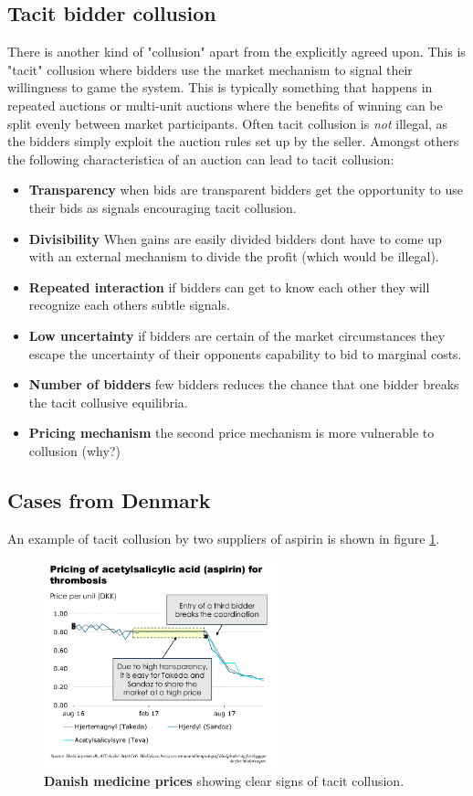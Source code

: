 
\subsection{Tacit bidder collusion}
There is another kind of "collusion" apart from the explicitly agreed upon. This is "tacit" collusion where bidders use the market mechanism to signal their willingness to game the system. This is typically something that happens in repeated auctions or multi-unit auctions where the benefits of winning can be split evenly between market participants. Often tacit collusion is \textit{not} illegal, as the bidders simply exploit the auction rules set up by the seller. Amongst others the following characteristica of an auction can lead to tacit collusion:
\begin{itemize}
    \item \textbf{Transparency} when bids are transparent bidders get the opportunity to use their bids as signals encouraging tacit collusion.
    \item \textbf{Divisibility} When gains are easily divided bidders dont have to come up with an external mechanism to divide the profit (which would be illegal). 
    \item \textbf{Repeated interaction} if bidders can get to know each other they will recognize each others subtle signals.
    \item \textbf{Low uncertainty} if bidders are certain of the market circumstances they escape the uncertainty of their opponents capability to bid to marginal costs. 
    \item \textbf{Number of bidders} few bidders reduces the chance that one bidder breaks the tacit collusive equilibria.
    \item \textbf{Pricing mechanism} the second price mechanism is more vulnerable to collusion (why?)
\end{itemize}

\subsection{Cases from Denmark}
An example of tacit collusion by two suppliers of aspirin is shown in figure \ref{fig: medprices}.
\begin{figure}
    \includegraphics[width=0.6\textwidth]{figures/medprices.png}
    \caption{\textbf{Danish medicine prices} showing clear signs of tacit collusion.}
    \label{fig: medprices}
\end{figure}

